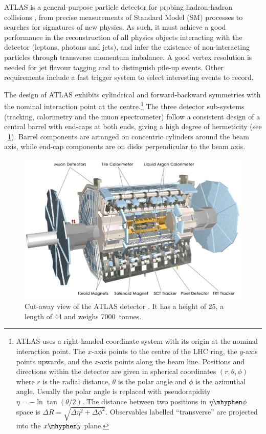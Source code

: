 
ATLAS is a general-purpose particle detector for probing hadron-hadron collisions 
\cite{ATLAS-detector}, from precise measurements of Standard Model (SM) processes to 
searches for signatures of new physics. As such, it must achieve a good performance in 
the reconstruction of all physics objects interacting with the detector (leptons, photons 
and jets), and infer the existence of non-interacting particles through transverse 
momentum imbalance. A good vertex resolution is needed for jet flavour tagging and to 
distinguish pile-up events. Other requirements include a fast trigger system to select 
interesting events to record.

The design of ATLAS exhibits cylindrical and forward-backward symmetries with the nominal 
interaction point at the centre.\footnote{
	ATLAS uses a right-handed coordinate system with its origin at the nominal 
	interaction point. The $x$-axis points to the centre of the LHC ring, the 
	$y$-axis points upwards, and the $z$-axis points along the beam line. Positions and 
	directions within the detector are given in spherical coordinates $(r, \theta, \phi)$ 
	where $r$ is the radial distance, $\theta$ is the polar angle and $\phi$ is the 
	azimuthal angle. Usually the polar angle is replaced with pseudorapidity 
	$\eta = -\ln\tan(\theta/2)$. The distance between two positions in $\eta\mhyphen\phi$ 
	space is $\Delta R = \sqrt{\Delta\eta^2 + \Delta\phi^2}$.
	Observables labelled ``transverse'' are projected into the $x\mhyphen y$ plane.
} 
The three detector sub-systems (tracking, calorimetry and the muon spectrometer) 
follow a consistent design of a central barrel with end-caps at both ends, giving a high 
degree of hermeticity (see \Figure~\ref{fig:atlas_whole}). Barrel components are arranged 
on concentric cylinders around the beam axis, while end-cap components are on disks 
perpendicular to the beam axis.

\begin{figure}
	\includegraphics[width=\hugefigwidth]{tex/experiment/atlas_whole}
	\caption{Cut-away view of the ATLAS detector \cite{ATLAS-detector}. It has a height 
	of \unit{25}{\metre}, a length of \unit{44}{\metre} and weighs 7000~tonnes.}
	\label{fig:atlas_whole}
\end{figure}

